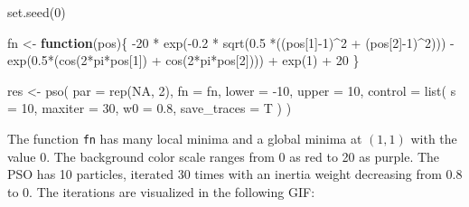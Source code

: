 \documentclass[
  oneside]{book}
\newenvironment{Shaded}{\begin{snugshade}}{\end{snugshade}}
\newcommand{\AttributeTok}[1]{\textcolor[rgb]{0.77,0.63,0.00}{#1}}
\newcommand{\ConstantTok}[1]{\textcolor[rgb]{0.00,0.00,0.00}{#1}}
\newcommand{\ControlFlowTok}[1]{\textcolor[rgb]{0.13,0.29,0.53}{\textbf{#1}}}
\newcommand{\DecValTok}[1]{\textcolor[rgb]{0.00,0.00,0.81}{#1}}
\newcommand{\FloatTok}[1]{\textcolor[rgb]{0.00,0.00,0.81}{#1}}
\newcommand{\FunctionTok}[1]{\textcolor[rgb]{0.00,0.00,0.00}{#1}}
\newcommand{\NormalTok}[1]{#1}
\newcommand{\OtherTok}[1]{\textcolor[rgb]{0.56,0.35,0.01}{#1}}
\newcommand{\SpecialCharTok}[1]{\textcolor[rgb]{0.00,0.00,0.00}{#1}}
\begin{document}
\begin{Shaded}
\begin{Highlighting}[]
\FunctionTok{set.seed}\NormalTok{(}\DecValTok{0}\NormalTok{)}

\NormalTok{fn }\OtherTok{\textless{}{-}} \ControlFlowTok{function}\NormalTok{(pos)\{}
  \SpecialCharTok{{-}}\DecValTok{20} \SpecialCharTok{*} \FunctionTok{exp}\NormalTok{(}\SpecialCharTok{{-}}\FloatTok{0.2} \SpecialCharTok{*} \FunctionTok{sqrt}\NormalTok{(}\FloatTok{0.5} \SpecialCharTok{*}\NormalTok{((pos[}\DecValTok{1}\NormalTok{]}\SpecialCharTok{{-}}\DecValTok{1}\NormalTok{)}\SpecialCharTok{\^{}}\DecValTok{2} \SpecialCharTok{+}\NormalTok{ (pos[}\DecValTok{2}\NormalTok{]}\SpecialCharTok{{-}}\DecValTok{1}\NormalTok{)}\SpecialCharTok{\^{}}\DecValTok{2}\NormalTok{))) }\SpecialCharTok{{-}} 
  \FunctionTok{exp}\NormalTok{(}\FloatTok{0.5}\SpecialCharTok{*}\NormalTok{(}\FunctionTok{cos}\NormalTok{(}\DecValTok{2}\SpecialCharTok{*}\NormalTok{pi}\SpecialCharTok{*}\NormalTok{pos[}\DecValTok{1}\NormalTok{]) }\SpecialCharTok{+} \FunctionTok{cos}\NormalTok{(}\DecValTok{2}\SpecialCharTok{*}\NormalTok{pi}\SpecialCharTok{*}\NormalTok{pos[}\DecValTok{2}\NormalTok{]))) }\SpecialCharTok{+} 
  \FunctionTok{exp}\NormalTok{(}\DecValTok{1}\NormalTok{) }\SpecialCharTok{+} \DecValTok{20}
\NormalTok{\}}

\NormalTok{res }\OtherTok{\textless{}{-}} \FunctionTok{pso}\NormalTok{(}
  \AttributeTok{par =} \FunctionTok{rep}\NormalTok{(}\ConstantTok{NA}\NormalTok{, }\DecValTok{2}\NormalTok{),}
  \AttributeTok{fn =}\NormalTok{ fn,}
  \AttributeTok{lower =} \SpecialCharTok{{-}}\DecValTok{10}\NormalTok{,}
  \AttributeTok{upper =} \DecValTok{10}\NormalTok{,}
  \AttributeTok{control =} \FunctionTok{list}\NormalTok{(}
    \AttributeTok{s =} \DecValTok{10}\NormalTok{,}
    \AttributeTok{maxiter =} \DecValTok{30}\NormalTok{,}
    \AttributeTok{w0 =} \FloatTok{0.8}\NormalTok{,}
    \AttributeTok{save\_traces =}\NormalTok{ T}
\NormalTok{  )}
\NormalTok{)}
\end{Highlighting}
\end{Shaded}

The function \texttt{fn} has many local minima and a global minima at \((1,1)\) with the value \(0\). The background color scale ranges from 0 as red to 20 as purple. The PSO has 10 particles, iterated 30 times with an inertia weight decreasing from 0.8 to 0. The iterations are visualized in the following GIF:

\end{document}
